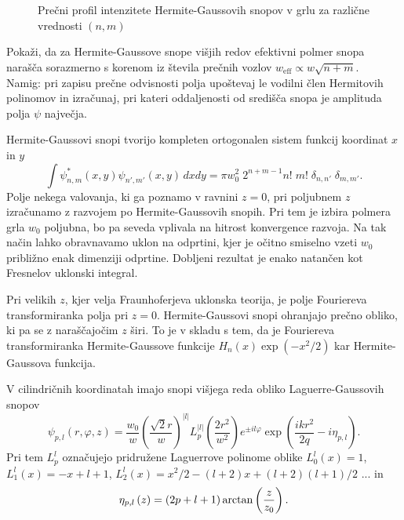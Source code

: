 \begin{figure}[h]
\centering
\def\svgwidth{90truemm} 

\caption{Prečni profil intenzitete Hermite-Gaussovih snopov v grlu 
za različne vrednosti $(n,m)$}
\label{fig:Gauss-Hermitevi-snopi}
\end{figure}

\begin{definition}
\label{naloga:HG}
Pokaži, da za Hermite-Gaussove snope višjih redov efektivni polmer snopa 
narašča sorazmerno s korenom iz števila prečnih vozlov $ w_{\mathrm{eff}}\propto w\sqrt{n+m}$.\\
Namig: pri zapisu prečne odvisnosti polja upoštevaj le vodilni člen Hermitovih polinomov 
in izračunaj, pri kateri oddaljenosti od središča snopa je amplituda polja $\psi$ največja.
\end{definition}

\begin{remark}
 Hermite-Gaussovi snopi tvorijo kompleten
ortogonalen sistem funkcij koordinat $x$ in $y$
\begin{equation}
\int\psi_{n,m}^{*}(x,y)\psi_{n',m'}(x,y)\, dx dy=\pi w_{0}^{2}\; 
2^{n+m-1}n!\;m!\; \delta_{n,n'}\;\delta_{m,m'}.
\end{equation}
Polje nekega valovanja, ki ga poznamo v ravnini $z=0$, pri
poljubnem $z$ izračunamo z razvojem po Hermite-Gaussovih snopih. Pri tem
je izbira polmera grla $w_{0}$ poljubna, bo pa seveda vplivala na
hitrost konvergence razvoja. Na tak način lahko obravnavamo uklon
na odprtini, kjer je očitno smiselno vzeti $w_{0}$ približno enak
dimenziji odprtine. Dobljeni rezultat je enako natančen kot Fresnelov
uklonski integral.

Pri velikih $z$, kjer velja Fraunhoferjeva uklonska teorija, je
polje Fouriereva transformiranka polja pri $z=0$. Hermite-Gaussovi
snopi ohranjajo prečno obliko, ki pa se z naraščajočim $z$ širi. 
To je v skladu s tem, da je Fouriereva transformiranka Hermite-Gaussove funkcije 
$H_{n}(x)\exp(-x^{2}/2)$ kar Hermite-Gaussova funkcija.
\end{remark}

V cilindričnih koordinatah imajo snopi višjega reda obliko Laguerre-Gaussovih 
snopov
\begin{equation}
\psi_{p,l}(r,\varphi,z)=\frac{w_{0}}{w}\left(\frac{\sqrt{2}r}{w}\right)^{|l|}
L_{p}^{|l|}\left(\frac{2r^{2}}{w^{2}}\right)e^{\pm il\varphi}\exp\left(\frac{ikr^{2}}{2q}-i\eta_{p,l}\right).
\label{eq:Gauss-Laguerrevi}
\end{equation}
Pri tem $L_{p}^{l}$ označujejo pridružene Laguerrove polinome oblike $L_{0}^{l}(x) = 1$, 
$L_{1}^{l}(x) = -x+l+1$, 
$L_{2}^{l}(x) = x^2/2-(l+2)x+(l+2)(l+1)/2$ ... in 
\begin{equation}\index{Gouyeva faza}
\eta_{p,l}\left(z\right)=(2p+l+1)\arctan\left(\frac{z}{z_{0}}\right).
\label{eq:etaGL}
\end{equation}

